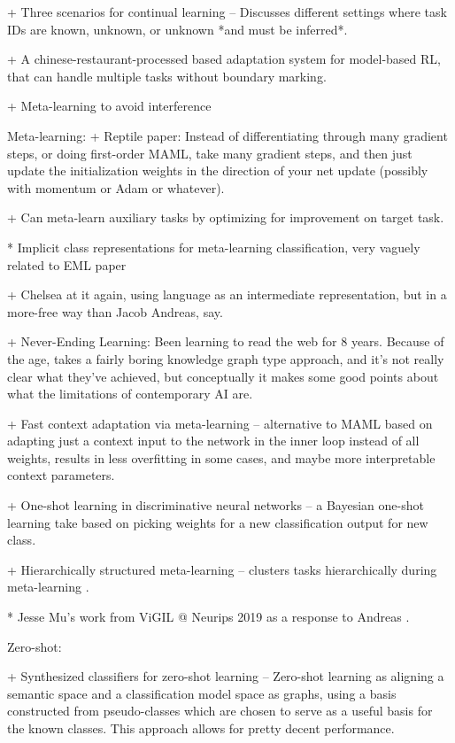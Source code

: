 + Three scenarios for continual learning -- Discusses different settings where task IDs are known, unknown, or unknown *and must be inferred*. \citep{Ven2018}

+ A chinese-restaurant-processed based adaptation system for model-based RL, that can handle multiple tasks without boundary marking. \citep{Nagabandi2019}

+ Meta-learning to avoid interference \citep{Velez2017}



Meta-learning:
+ Reptile paper: Instead of differentiating through many gradient steps, or doing first-order MAML, take many gradient steps, and then just update the initialization weights in the direction of your net update (possibly with momentum or Adam or whatever). \citep{Nichol2018} 

+ Can meta-learn auxiliary tasks by optimizing for improvement on target task. \citep{Liu2019a}

* Implicit class representations for meta-learning classification, very vaguely related to EML paper \citep{Ravichandran2019}

+ Chelsea at it again, using language as an intermediate representation, but in a more-free way than Jacob Andreas, say. \citep{Jiang2019}

+ Never-Ending Learning: Been learning to read the web for 8 years. Because of the age, takes a fairly boring knowledge graph type approach, and it's not really clear what they've achieved, but conceptually it makes some good points about what the limitations of contemporary AI are. \citep{Mitchell2018}

+ Fast context adaptation via meta-learning -- alternative to MAML based on adapting just a context input to the network in the inner loop instead of all weights, results in less overfitting in some cases, and maybe more interpretable context parameters. \citep{Zintgraf2018}

+ One-shot learning in discriminative neural networks -- a Bayesian one-shot learning take based on picking weights for a new classification output for new class. \citep{Burgess2016}

+ Hierarchically structured meta-learning -- clusters tasks hierarchically during meta-learning \citep{Yao2019}.

* Jesse Mu's work from ViGIL @ Neurips 2019 as a response to Andreas \citep{Mu2019}.


Zero-shot:

+ Synthesized classifiers for zero-shot learning -- Zero-shot learning as aligning a semantic space and a classification model space as graphs, using a basis constructed from pseudo-classes which are chosen to serve as a useful basis for the known classes. This approach allows for pretty decent performance. \citep{Changpinyo2016} 

